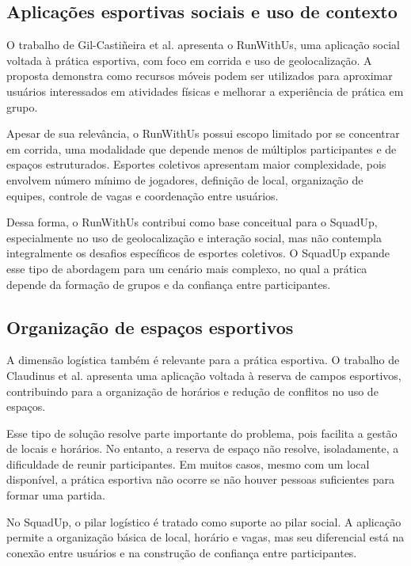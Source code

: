 \documentclass[a4paper, 12pt]{article}
\begin{document}
\begin{justify}
\subsection{Aplicações esportivas sociais e uso de contexto}

O trabalho de Gil-Castiñeira et al. \citep{gil-castineira_runwithus_2011} apresenta o RunWithUs, uma aplicação social voltada à prática esportiva, com foco em corrida e uso de geolocalização. A proposta demonstra como recursos móveis podem ser utilizados para aproximar usuários interessados em atividades físicas e melhorar a experiência de prática em grupo.

Apesar de sua relevância, o RunWithUs possui escopo limitado por se concentrar em corrida, uma modalidade que depende menos de múltiplos participantes e de espaços estruturados. Esportes coletivos apresentam maior complexidade, pois envolvem número mínimo de jogadores, definição de local, organização de equipes, controle de vagas e coordenação entre usuários.

Dessa forma, o RunWithUs contribui como base conceitual para o SquadUp, especialmente no uso de geolocalização e interação social, mas não contempla integralmente os desafios específicos de esportes coletivos. O SquadUp expande esse tipo de abordagem para um cenário mais complexo, no qual a prática depende da formação de grupos e da confiança entre participantes.

\subsection{Organização de espaços esportivos}

A dimensão logística também é relevante para a prática esportiva. O trabalho de Claudinus et al. \citep{claudinus_sport_2020} apresenta uma aplicação voltada à reserva de campos esportivos, contribuindo para a organização de horários e redução de conflitos no uso de espaços.

Esse tipo de solução resolve parte importante do problema, pois facilita a gestão de locais e horários. No entanto, a reserva de espaço não resolve, isoladamente, a dificuldade de reunir participantes. Em muitos casos, mesmo com um local disponível, a prática esportiva não ocorre se não houver pessoas suficientes para formar uma partida.

No SquadUp, o pilar logístico é tratado como suporte ao pilar social. A aplicação permite a organização básica de local, horário e vagas, mas seu diferencial está na conexão entre usuários e na construção de confiança entre participantes.


\end{justify}
\end{document}
